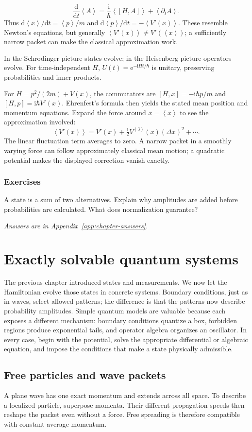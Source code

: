 \documentclass[11pt,oneside]{book}
\newcommand{\dd}{\mathrm{d}}
\newcommand{\ii}{\mathrm{i}}
\newcommand{\ee}{\mathrm{e}}
\newcommand{\avg}[1]{\left\langle #1\right\rangle}
\newcommand{\od}[2]{\frac{\dd #1}{\dd #2}}
\theoremstyle{reviewstyle}
\newcommand{\learningcheck}[1]{\subsection*{Exercises}\noindent #1\par\smallskip\noindent\emph{Answers are in Appendix~\ref{app:chapter-answers}.}}
\begin{document}
\begin{equation}\od{}{t}\avg A=\frac{\ii}{\hbar}\avg{[H,A]}+\avg{\partial_t A}.\end{equation}
Thus $\dd\avg x/\dd t=\avg p/m$ and $\dd\avg p/\dd t=-\avg{V'(x)}$. These resemble Newton's equations, but generally $\avg{V'(x)}\neq V'(\avg x)$; a sufficiently narrow packet can make the classical approximation work.

In the Schrodinger picture states evolve; in the Heisenberg picture operators evolve. For time-independent $H$, $U(t)=\ee^{-\ii Ht/\hbar}$ is unitary, preserving probabilities and inner products.

For $H=p^2/(2m)+V(x)$, the commutators are $[H,x]=-\ii\hbar p/m$ and $[H,p]=\ii\hbar V'(x)$. Ehrenfest's formula then yields the stated mean position and momentum equations. Expand the force around $\bar x=\avg x$ to see the approximation involved:
\begin{equation}
\avg{V'(x)}=V'(\bar x)+\tfrac12V^{(3)}(\bar x)(\Delta x)^2+\cdots.
\end{equation}
The linear fluctuation term averages to zero. A narrow packet in a smoothly varying force can follow approximately classical mean motion; a quadratic potential makes the displayed correction vanish exactly.

\learningcheck{A state is a sum of two alternatives. Explain why amplitudes are added before probabilities are calculated. What does normalization guarantee?}

\chapter{Exactly solvable quantum systems}
The previous chapter introduced states and measurements. We now let the Hamiltonian evolve those states in concrete systems. Boundary conditions, just as in waves, select allowed patterns; the difference is that the patterns now describe probability amplitudes.
Simple quantum models are valuable because each exposes a different mechanism: boundary conditions quantize a box, forbidden regions produce exponential tails, and operator algebra organizes an oscillator. In every case, begin with the potential, solve the appropriate differential or algebraic equation, and impose the conditions that make a state physically admissible.

\section{Free particles and wave packets}
A plane wave has one exact momentum and extends across all space. To describe a localized particle, superpose momenta. Their different propagation speeds then reshape the packet even without a force. Free spreading is therefore compatible with constant average momentum.
\end{document}
